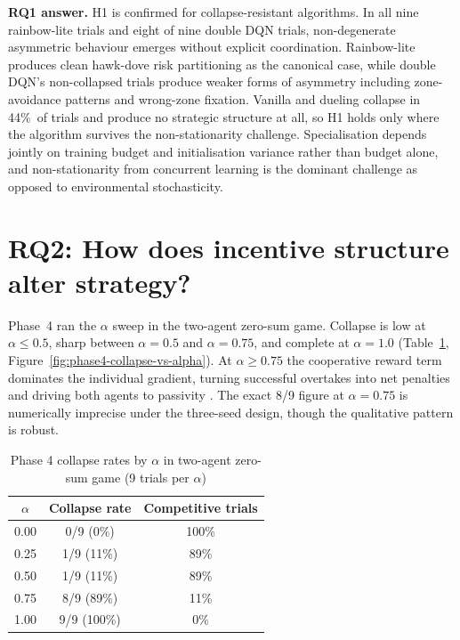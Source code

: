 \textbf{RQ1 answer.} H1 is confirmed for collapse-resistant algorithms. In all nine rainbow-lite trials and eight of nine double DQN trials, non-degenerate asymmetric behaviour emerges without explicit coordination. Rainbow-lite produces clean hawk-dove risk partitioning as the canonical case, while double DQN's non-collapsed trials produce weaker forms of asymmetry including zone-avoidance patterns and wrong-zone fixation. Vanilla and dueling collapse in 44\%\ of trials and produce no strategic structure at all, so H1 holds only where the algorithm survives the non-stationarity challenge. Specialisation depends jointly on training budget and initialisation variance rather than budget alone, and non-stationarity from concurrent learning is the dominant challenge as opposed to environmental stochasticity.

\section{RQ2: How does incentive structure alter strategy?}
\label{sec:rq2}

Phase~4 ran the $\alpha$ sweep in the two-agent zero-sum game. Collapse is low at $\alpha \le 0.5$, sharp between $\alpha = 0.5$ and $\alpha = 0.75$, and complete at $\alpha = 1.0$ (Table~\ref{tab:phase4-collapse}, Figure~\ref{fig:phase4-collapse-vs-alpha}). At $\alpha \ge 0.75$ the cooperative reward term dominates the individual gradient, turning successful overtakes into net penalties and driving both agents to passivity \citep{claus1998dynamics}. The exact 8/9 figure at $\alpha = 0.75$ is numerically imprecise under the three-seed design, though the qualitative pattern is robust.

\begin{table}[htbp]
\centering
\small
\caption{Phase 4 collapse rates by $\alpha$ in two-agent zero-sum game (9 trials per $\alpha$)}
\label{tab:phase4-collapse}
\begin{tabular}{|c|c|c|}
\hline
\textbf{$\alpha$} & \textbf{Collapse rate} & \textbf{Competitive trials} \\
\hline
0.00 & 0/9 (0\%)   & 100\% \\
0.25 & 1/9 (11\%)  & 89\% \\
0.50 & 1/9 (11\%)  & 89\% \\
0.75 & 8/9 (89\%)  & 11\% \\
1.00 & 9/9 (100\%) & 0\%  \\
\hline
\end{tabular}
\end{table}

